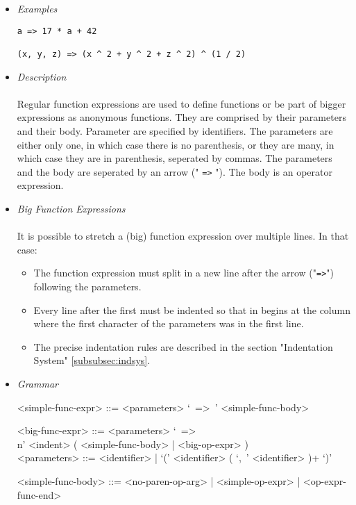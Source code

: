 \documentclass{article}
\begin{document}
\begin{itemize}
\item \textit{Examples}

\begin{verbatim}
a => 17 * a + 42

(x, y, z) => (x ^ 2 + y ^ 2 + z ^ 2) ^ (1 / 2)
\end{verbatim}

\item \textit{Description}\\\\
Regular function expressions are used to define functions or be part of bigger
expressions as anonymous functions. They are comprised by their parameters and
their body. Parameter are specified by identifiers. The parameters are either
only one, in which case there is no parenthesis, or they are many, in which
case they are in parenthesis, seperated by commas. The parameters and the body
are seperated by an arrow (" \texttt{=>} "). The body is an operator
expression.

\item \textit{Big Function Expressions}\\\\
It is possible to stretch a (big) function expression over multiple lines.
In that case:
\begin{itemize}
\item
The function expression must split in a new line after the arrow
("\texttt{=>}") following the parameters.

\item
Every line after the first must be indented so that in begins at the column 
where the first character of the parameters was in the first line.

\item
The precise indentation rules are described in the section
"Indentation System" \ref{subsubsec:indsys}.
\end{itemize}

\item \textit{Grammar}
\begin{grammar}
<simple-func-expr> ::=
<parameters> `\ =>\ ' <simple-func-body>

<big-func-expr> ::=
<parameters> `\ =>\\n' <indent> ( <simple-func-body> | <big-op-expr> )
\\

<parameters> ::= <identifier> | `(' <identifier> ( `,\ ' <identifier> )+ `)'

<simple-func-body> ::= <no-paren-op-arg> | <simple-op-expr> | <op-expr-func-end>
\end{grammar}
\end{itemize}
\end{document}
